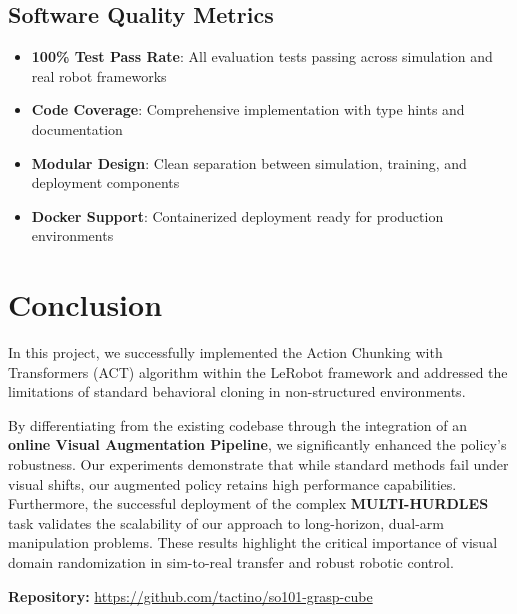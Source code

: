 \documentclass[10pt]{article} %
\begin{document}
\subsection{Software Quality Metrics}

\begin{itemize}
    \item \textbf{100\% Test Pass Rate}: All evaluation tests passing across simulation and real robot frameworks
    \item \textbf{Code Coverage}: Comprehensive implementation with type hints and documentation
    \item \textbf{Modular Design}: Clean separation between simulation, training, and deployment components
    \item \textbf{Docker Support}: Containerized deployment ready for production environments
\end{itemize}

\section{Conclusion}

In this project, we successfully implemented the Action Chunking with Transformers (ACT) algorithm within the LeRobot framework and addressed the limitations of standard behavioral cloning in non-structured environments. 

By differentiating from the existing codebase through the integration of an \textbf{online Visual Augmentation Pipeline}, we significantly enhanced the policy's robustness. Our experiments demonstrate that while standard methods fail under visual shifts, our augmented policy retains high performance capabilities. Furthermore, the successful deployment of the complex \textbf{MULTI-HURDLES} task validates the scalability of our approach to long-horizon, dual-arm manipulation problems. These results highlight the critical importance of visual domain randomization in sim-to-real transfer and robust robotic control.

\vspace{1em}
\textbf{Repository:} \url{https://github.com/tactino/so101-grasp-cube}
\end{document}
